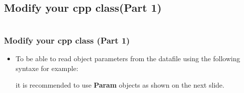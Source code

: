 \documentclass[10pt, hyperref={unicode=true,pdfusetitle, bookmarks=true,bookmarksnumbered=false,bookmarksopen=false, breaklinks=false,pdfborder={0 0 1},backref=true,colorlinks=true,linkcolor=darkblue,pageanchor, urlcolor=darkblue}]{beamer}
\begin{document}
\subsection{{\bf{Modify your cpp class(Part 1)}}}
\begin{frame}
\begin{columns}[c] 
\tableofcontents[sections={1-4},currentsection, currentsubsection]
\tableofcontents[sections={5-10},currentsection, currentsubsection]
\end{columns}
\end{frame}
\begin{frame}
\frametitle{Modify your cpp class (Part 1)}
\begin{block}{}

\begin{itemize}
\item To be able to read object parameters from the datafile using the following syntaxe for example:
\begin{center}
\end{center}
it is recommended to use \textbf{Param} objects as shown on the next slide.

\end{itemize}

\end{block}
\end{frame}
\end{document}
